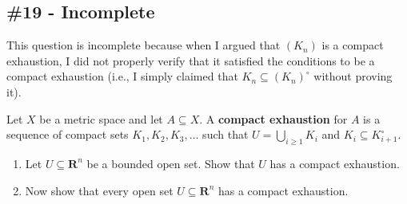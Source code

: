 \documentclass{article}
\newcommand{\R}{\mathbf{R}}
\theoremstyle{plain} %
\numberwithin{thm}{section} %
\theoremstyle{definition}
\begin{document}
        \subsection{\#19 - Incomplete}

        This question is incomplete because when I argued that \((K_n)\) is a compact exhaustion, I did not properly verify that it satisfied the conditions to be a compact exhaustion (i.e., I simply claimed that \(K_n \subseteq (K_n)^\circ\) without proving it).

        Let $X$ be a metric space and let $A\subseteq X$. A \textbf{compact exhaustion} for $A$ is a sequence of compact sets $K_1,K_2,K_3,\ldots$ such that $U=\bigcup_{i\geq 1}K_i$ and $K_i\subseteq K_{i+1}^\circ$.
        \begin{enumerate}[label=(\alph*)]
            \item Let $U\subseteq \R^n$ be a bounded open set. Show that $U$ has a compact exhaustion.
            \item Now show that every open set $U\subseteq \R^n$ has a compact exhaustion.
        \end{enumerate}
\end{document}
